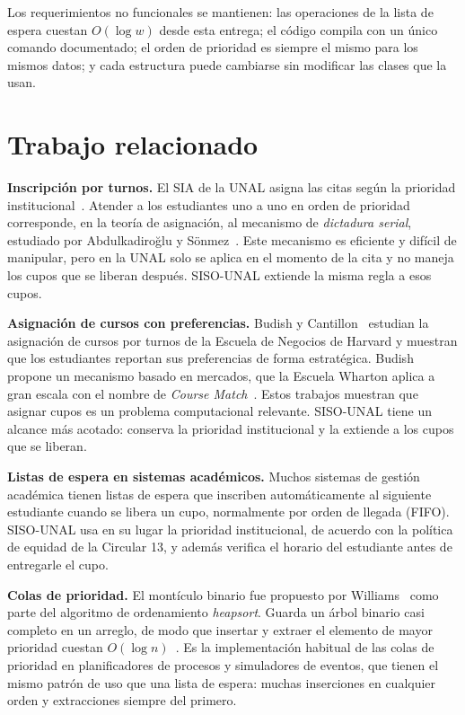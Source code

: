 \documentclass[conference]{IEEEtran}
\begin{document}
Los requerimientos no funcionales se mantienen: las operaciones de la lista de espera cuestan $O(\log w)$ desde esta entrega; el código compila con un único comando documentado; el orden de prioridad es siempre el mismo para los mismos datos; y cada estructura puede cambiarse sin modificar las clases que la usan.


\section{Trabajo relacionado}

\textbf{Inscripción por turnos.} El SIA de la UNAL asigna las citas según la prioridad institucional~\cite{circular13}. Atender a los estudiantes uno a uno en orden de prioridad corresponde, en la teoría de asignación, al mecanismo de \emph{dictadura serial}, estudiado por Abdulkadiroğlu y Sönmez~\cite{abdulkadiroglu1998}. Este mecanismo es eficiente y difícil de manipular, pero en la UNAL solo se aplica en el momento de la cita y no maneja los cupos que se liberan después. SISO-UNAL extiende la misma regla a esos cupos.

\textbf{Asignación de cursos con preferencias.} Budish y Cantillon~\cite{budish2012} estudian la asignación de cursos por turnos de la Escuela de Negocios de Harvard y muestran que los estudiantes reportan sus preferencias de forma estratégica. Budish~\cite{budish2011} propone un mecanismo basado en mercados, que la Escuela Wharton aplica a gran escala con el nombre de \emph{Course Match}~\cite{budish2017}. Estos trabajos muestran que asignar cupos es un problema computacional relevante. SISO-UNAL tiene un alcance más acotado: conserva la prioridad institucional y la extiende a los cupos que se liberan.

\textbf{Listas de espera en sistemas académicos.} Muchos sistemas de gestión académica tienen listas de espera que inscriben automáticamente al siguiente estudiante cuando se libera un cupo, normalmente por orden de llegada (FIFO). SISO-UNAL usa en su lugar la prioridad institucional, de acuerdo con la política de equidad de la Circular 13, y además verifica el horario del estudiante antes de entregarle el cupo.

\textbf{Colas de prioridad.} El montículo binario fue propuesto por Williams~\cite{williams1964} como parte del algoritmo de ordenamiento \emph{heapsort}. Guarda un árbol binario casi completo en un arreglo, de modo que insertar y extraer el elemento de mayor prioridad cuestan $O(\log n)$~\cite{cormen}. Es la implementación habitual de las colas de prioridad en planificadores de procesos y simuladores de eventos, que tienen el mismo patrón de uso que una lista de espera: muchas inserciones en cualquier orden y extracciones siempre del primero.
\end{document}
